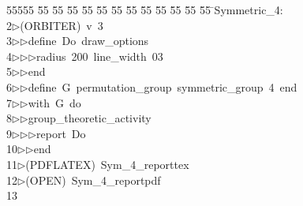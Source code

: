 %
%
\begin{tabbing}
55555 \= 55 \= 55 \= 55 \= 55 \= 55 \= 55 \= 55 \= 55 \= 55 \= 55 \= 55 \= 55 \= \>Symmetric\_4:\\[0pt]
2\>$\triangleright$\>(ORBITER)\ v\ 3\ \\[0pt]
3\>$\triangleright$\>$\triangleright$\>define\ Do\ draw\_options\ \\[0pt]
4\>$\triangleright$\>$\triangleright$\>$\triangleright$\>radius\ 200\ line\_width\ 03\ \\[0pt]
5\>$\triangleright$\>$\triangleright$\>end\ \\[0pt]
6\>$\triangleright$\>$\triangleright$\>define\ G\ permutation\_group\ symmetric\_group\ 4\ end\ \\[0pt]
7\>$\triangleright$\>$\triangleright$\>with\ G\ do\ \\[0pt]
8\>$\triangleright$\>$\triangleright$\>group\_theoretic\_activity\ \\[0pt]
9\>$\triangleright$\>$\triangleright$\>$\triangleright$\>report\ Do\ \\[0pt]
10\>$\triangleright$\>$\triangleright$\>end\\[0pt]
11\>$\triangleright$\>(PDFLATEX)\ Sym\_4\_reporttex\\[0pt]
12\>$\triangleright$\>(OPEN)\ Sym\_4\_reportpdf\\[0pt]
13\>\end{tabbing}
